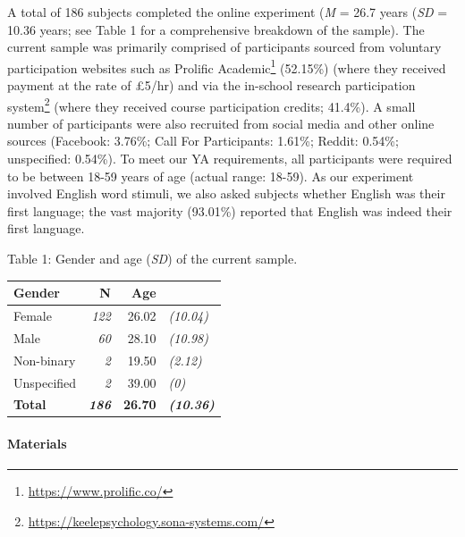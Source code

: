 \documentclass[
  11pt,
]{article}
\begin{document}
A total of 186 subjects completed the online experiment (\emph{M} = 26.7
years (\emph{SD} = 10.36 years; see Table 1 for a comprehensive
breakdown of the sample). The current sample was primarily comprised of
participants sourced from voluntary participation websites such as
Prolific Academic\footnote{\url{https://www.prolific.co/}} (52.15\%)
(where they received payment at the rate of £5/hr) and via the in-school
research participation system\footnote{\url{https://keelepsychology.sona-systems.com/}}
(where they received course participation credits; 41.4\%). A small
number of participants were also recruited from social media and other
online sources (Facebook: 3.76\%; Call For Participants: 1.61\%; Reddit:
0.54\%; unspecified: 0.54\%). To meet our YA requirements, all
participants were required to be between 18-59 years of age (actual
range: 18-59). As our experiment involved English word stimuli, we also
asked subjects whether English was their first language; the vast
majority (93.01\%) reported that English was indeed their first
language.

Table 1: Gender and age (\emph{SD}) of the current sample.

\begin{table}[!h]
\centering
\begin{tabular}{l>{}rr>{}l}
\toprule
Gender & N & Age & \\
\midrule
Female & \em{122} & 26.02 & \em{(10.04)}\\
Male & \em{60} & 28.10 & \em{(10.98)}\\
Non-binary & \em{2} & 19.50 & \em{(2.12)}\\
Unspecified & \em{2} & 39.00 & \em{(0)}\\
\textbf{Total} & \textbf{\em{186}} & \textbf{26.70} & \textbf{\em{(10.36)}}\\
\bottomrule
\end{tabular}
\end{table}

\hypertarget{materials}{%
\paragraph{Materials}\label{materials}}
\end{document}
